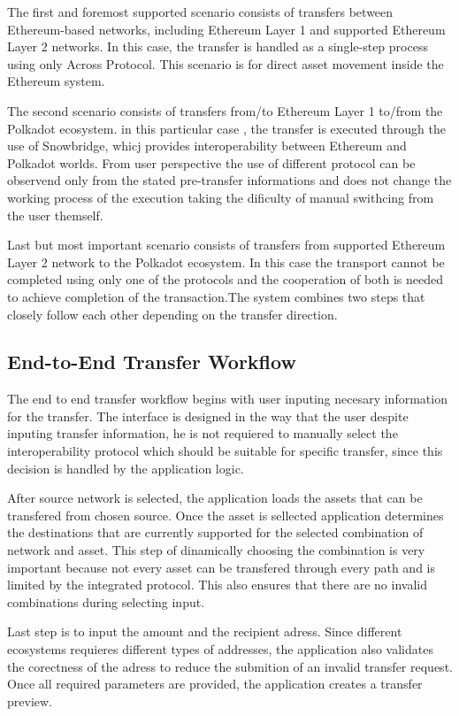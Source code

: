 \documentclass[conference]{IEEEtran}
\begin{document}
The first and foremost supported scenario consists of transfers between Ethereum-based networks, including Ethereum Layer 1 and supported Ethereum Layer 2 networks. In this case, the transfer is handled as a single-step process using only Across Protocol. This scenario is for direct asset movement inside the Ethereum system.

The second scenario consists of transfers from\slash to Ethereum Layer 1 to\slash from the Polkadot ecosystem. in this particular case , the transfer is executed through the use of Snowbridge, whicj provides interoperability between Ethereum and Polkadot worlds. From user perspective the use of different protocol can be observend only from the stated pre-transfer informations and does not change the working process of the execution taking the dificulty of manual swithcing from the user themself.

Last but most important scenario consists of transfers from supported Ethereum Layer 2 network to the Polkadot ecosystem. In this case the transport cannot be completed using only one of the protocols and the cooperation of both is needed to achieve completion of the transaction.The system combines two steps that closely follow each other depending on the transfer direction. 


\subsection{End-to-End Transfer Workflow}

The end to end transfer workflow begins with user inputing necesary information for the transfer. The interface is designed in the way that the user despite inputing transfer information, he is not requiered to manually select the interoperability protocol which should be suitable for specific transfer, since this decision is handled by the application logic.

After source network is selected, the application loads the assets that can be transfered from chosen source. Once the asset is sellected application determines the destinations that are currently supported for the selected combination of network and asset. This step of dinamically choosing the combination is very important because not every asset can be transfered through every path and is limited by the integrated protocol. This also ensures that there are no invalid combinations during selecting input.

Last step is to input the amount and the recipient adress. Since different ecosystems requieres different types of addresses, the application also validates the corectness of the adress to reduce the submition of an invalid transfer request. Once all required parameters are provided, the application creates a transfer preview.
\end{document}
